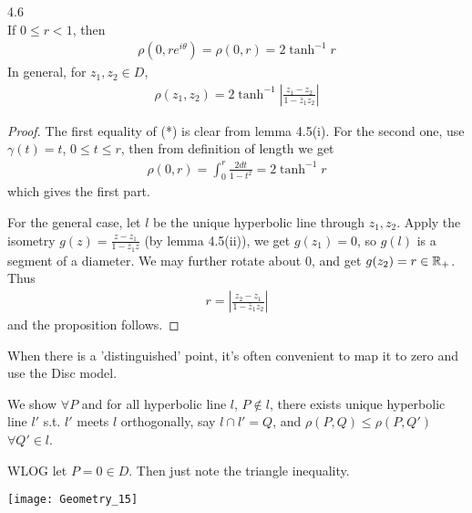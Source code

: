 \documentclass[a4paper]{article}
\begin{document}
\begin{prop} 4.6\\
If $0\leq r < 1$, then
\begin{equation*}\tag{*}
\begin{aligned}
\rho(0,re^{i\theta}) = \rho(0,r)  = 2\tanh^{-1} r
\end{aligned}
\end{equation*}
In general, for $z_1,z_2 \in D$,
\begin{equation*}
\begin{aligned}
\rho(z_1,z_2) = 2\tanh^{-1} \left| \frac{z_1-z_2}{1-\bar{z}_1z_2}\right|
\end{aligned}
\end{equation*}
\begin{proof}
The first equality of (*) is clear from lemma 4.5(i). For the second one, use $\gamma(t) = t$, $0\leq t \leq r$, then from definition of length we get
\begin{equation*}
\begin{aligned}
\rho(0,r) = \int_0^r \frac{2dt}{1-t^2} = 2\tanh^{-1} r
\end{aligned}
\end{equation*}
which gives the first part.

For the general case, let $l$ be the unique hyperbolic line through $z_1,z_2$. Apply the isometry $g(z) = \frac{z-z_1}{1-\bar{z}_1z}$ (by lemma 4.5(ii)), we get $g(z_1)=0$, so $g(l)$ is a segment of a diameter. We may further rotate about $0$, and get $g(z_2) = r \in \mathbb{R}_+$. Thus
\begin{equation*}
\begin{aligned}
r=\left|\frac{z_2-z_1}{1-\bar{z}_1z_2}\right|
\end{aligned}
\end{equation*}
and the proposition follows.
\end{proof}
\end{prop}

\begin{rem}
When there is a 'distinguished' point, it's often convenient to map it to zero and use the Disc model.
\end{rem}

\begin{eg}
We show $\forall P$ and for all hyperbolic line $l$, $P \not\in l$, there exists unique hyperbolic line $l'$ s.t. $l'$ meets $l$ orthogonally, say $l \cap l' = Q$, and $\rho(P,Q) \leq \rho(P,Q')$ $\forall Q' \in l$.

WLOG let $P=0 \in D$. Then just note the triangle inequality.

\texttt{[image: Geometry\_15]}
\end{eg}
\end{document}

